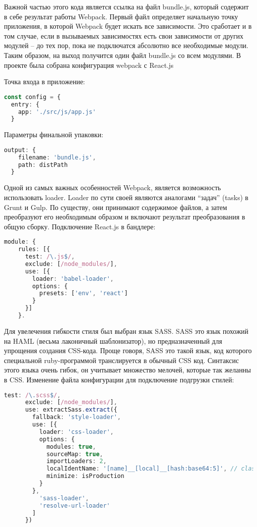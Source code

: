 Важной частью этого кода является ссылка на файл bundle.js, который содержит в себе результат работы Webpack.
Первый файл определяет начальную точку приложения, в которой Webpack будет искать все зависимости. Это сработает и в том случае, если в вызываемых зависимостях 
есть свои зависимости от других модулей -- до тех пор, пока не подключатся абсолютно все необходимые модули. Таким образом, на выход получится один файл bundle.js со всем модулями.
В проекте была собрана конфигурация webpack с React.js

Точка входа в приложение:
\begin{lstlisting}[language=TypeScript, label=lst:domain:html]
const config = {
  entry: {
    app: './src/js/app.js'
  }
\end{lstlisting}

Параметры финальной упаковки:
\begin{lstlisting}[language=TypeScript, label=lst:domain:html]
  output: {
    filename: 'bundle.js',
    path: distPath
  }
\end{lstlisting}

Одной из самых важных особенностей Webpack, является возможность использовать loader. Loader по сути своей являются аналогами “задач” (tasks) в Grunt и Gulp. По существу,
они принимают содержимое файлов, а затем преобразуют его необходимым образом и включают результат преобразования в общую сборку.
Подключение React.js в бандлере:
\begin{lstlisting}[language=TypeScript, label=lst:domain:html]
 module: {
    rules: [{
      test: /\.js$/,
      exclude: [/node_modules/],
      use: [{
        loader: 'babel-loader',
        options: {
          presets: ['env', 'react']
        }
      }]
    }.
\end{lstlisting}

Для увелечения гибкости стиля был выбран язык SASS. SASS это язык похожий на HAML (весьма лаконичный шаблонизатор), но предназначенный 
для упрощения создания CSS-кода. Проще говоря, SASS это такой язык, код которого специальной ruby-программой транслируется в обычный CSS код. Синтаксис этого языка очень гибок, 
он учитывает множество мелочей, которые так желанны в CSS. 
Изменение файла конфигурации для подключение подгрузки стилей:
\begin{lstlisting}[language=TypeScript, label=lst:domain:html]
test: /\.scss$/,
      exclude: [/node_modules/],
      use: extractSass.extract({
        fallback: 'style-loader',
        use: [{
          loader: 'css-loader',
          options: {
            modules: true,
            sourceMap: true,
            importLoaders: 2,
            localIdentName: '[name]__[local]__[hash:base64:5]', // className template
            minimize: isProduction
          }
        },
          'sass-loader',
          'resolve-url-loader'
        ]
      })
\end{lstlisting}

